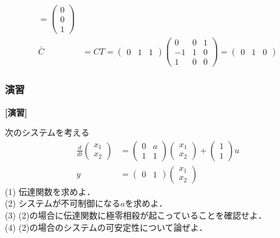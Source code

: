 \begin{frame}[t]
\begin{align*}
	=
	\left(\begin{array}{c}
	     0 \\
	     0 \\
	     1 
	\end{array}\right)
\\
	\bar{C}
	& = C T
	=
	\left(\begin{array}{ccc}
	     0      & 1      & 1 
	\end{array}\right)
	\left(\begin{array}{ccc}
	     0  & 0 & 1  \\
	     -1 & 1 & 0  \\
	     1  & 0 & 0
	\end{array}\right)
	=
	\left(\begin{array}{ccc}
	     0      & 1      & 0 
	\end{array}\right)
\end{align*}

\end{frame}


\begin{frame}[t]
\frametitle{演習}

\noindent
{\bf[演習]}\nopagebreak

次のシステムを考える
\begin{align}
 \frac{d}{dt}
  \left(\begin{array}{c}
     {x}_1 \\
	 {x}_2
	\end{array}\right)
  &=
  \left(\begin{array}{cc}
     0      & a  \\
     1      & 1
	\end{array}\right)
  \left(\begin{array}{c}
     {x}_1 \\
	 {x}_2
	\end{array}\right)
  +
  \left(\begin{array}{c}
     1 \\
	 1 
	\end{array}\right)
  u 
\nonumber \\
	y &= 
  \left(\begin{array}{cc}
     0      & 1   
	\end{array}\right)
  \left(\begin{array}{c}
     {x}_1 \\
	 {x}_2 
	\end{array}\right)
\nonumber 
\end{align}
(1) 伝達関数を求めよ．
\\[3mm]

(2) システムが不可制御になる$a$を求めよ．
\\[3mm]

(3) (2)の場合に伝達関数に極零相殺が起こっていることを確認せよ．
\\[3mm]

(4) (2)の場合のシステムの可安定性について論ぜよ．

\end{frame}



